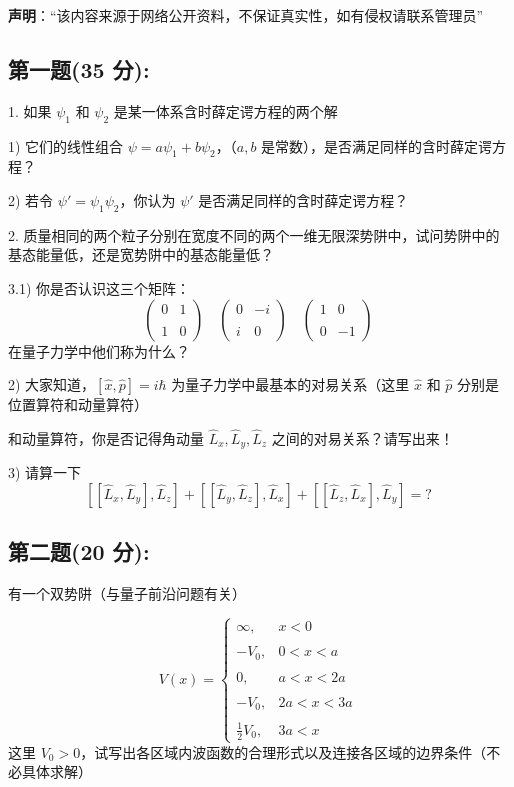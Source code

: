 
\textbf{声明}：“该内容来源于网络公开资料，不保证真实性，如有侵权请联系管理员”

\subsection{第一题(35 分):}
1. 如果 $\psi_1$ 和 $\psi_2$ 是某一体系含时薛定谔方程的两个解

1) 它们的线性组合 $\psi = a\psi_1 + b\psi_2$，（$a, b$ 是常数），是否满足同样的含时薛定谔方程？

2) 若令 $\psi' = \psi_1\psi_2$，你认为 $\psi'$ 是否满足同样的含时薛定谔方程？

2. 质量相同的两个粒子分别在宽度不同的两个一维无限深势阱中，试问势阱中的基态能量低，还是宽势阱中的基态能量低？

3.1) 你是否认识这三个矩阵：
\[\begin{pmatrix}0 & 1 \\\\1 & 0\end{pmatrix}\quad\begin{pmatrix}0 & -i \\\\i & 0\end{pmatrix}\quad\begin{pmatrix}1 & 0 \\\\0 & -1\end{pmatrix}~\]
在量子力学中他们称为什么？

2) 大家知道，$[\hat{x}, \hat{p}] = i\hbar$ 为量子力学中最基本的对易关系（这里 $\hat{x}$ 和 $\hat{p}$ 分别是位置算符和动量算符）

和动量算符，你是否记得角动量 $\hat{L}_x, \hat{L}_y, \hat{L}_z$ 之间的对易关系？请写出来！

3) 请算一下
\[[[\hat{L}_x, \hat{L}_y], \hat{L}_z] + [[\hat{L}_y, \hat{L}_z], \hat{L}_x] + [[\hat{L}_z, \hat{L}_x], \hat{L}_y] = ?~\]
\subsection{第二题(20 分):}
有一个双势阱（与量子前沿问题有关）

\[V(x) =\begin{cases} \infty, & x < 0 \\\\-V_0, & 0 < x < a \\\\0, & a < x < 2a \\\\-V_0, & 2a < x < 3a \\\\\frac{1}{2} V_0, & 3a < x \end{cases}~\]
这里 $V_0 > 0$，试写出各区域内波函数的合理形式以及连接各区域的边界条件（不必具体求解）


